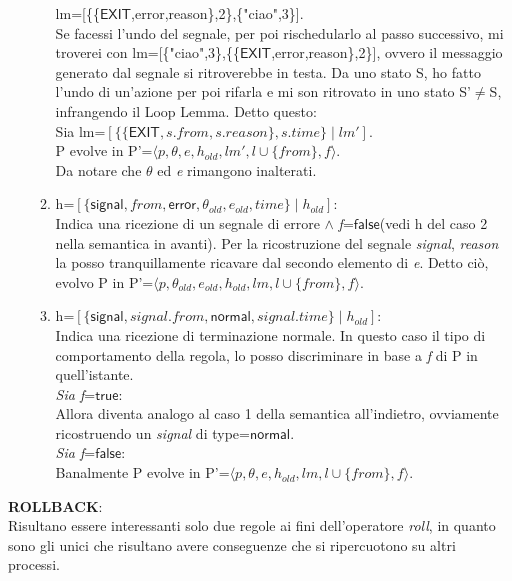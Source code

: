 \documentclass[Contributo.tex]{subfiles}
\begin{document}
\begin{itemize}
\begin{enumerate}
			  lm=[\{\{$\mathsf{EXIT}$,error,reason\},2\},\{"ciao",3\}].\\
			  Se facessi l'undo del segnale, per poi rischedularlo al passo successivo, mi troverei con lm=[\{"ciao",3\},\{\{$\mathsf{EXIT}$,error,reason\},2\}], ovvero il messaggio generato dal segnale si ritroverebbe in testa.
			  Da uno stato S, ho fatto l'undo di un'azione per poi rifarla e mi son ritrovato in uno stato S'$\neq$S, infrangendo il Loop Lemma.
			  Detto questo:\\
			  Sia lm=$\displaystyle [\{\{\mathsf{EXIT},s.from,s.reason\},s.time\} \mid lm']$.\\
			  P evolve in P'=$\displaystyle \langle p,\theta,e,h_{old},lm',l \cup \{from\},f \rangle$.\\
			  Da notare che $\theta$ ed \textit{e} rimangono inalterati.
		\item h=$\displaystyle [\{\mathsf{signal},from,\mathsf{error},\theta_{old},e_{old},time\} \mid h_{old}]$:\\
			  Indica una ricezione di un segnale di errore $\wedge$ \textit{f}=$\mathsf{false}$(vedi h del caso 2 nella semantica in avanti).
			  Per la ricostruzione del segnale \textit{signal}, \textit{reason} la posso tranquillamente ricavare dal secondo elemento di \textit{e}.
			  Detto ciò, evolvo P in P'=$\displaystyle \langle p,\theta_{old},e_{old},h_{old},lm,l \cup \{from\},f \rangle$.
		\item h=$\displaystyle [\{\mathsf{signal},signal.from,\mathsf{normal},signal.time\} \mid h_{old}]$:\\
			  Indica una ricezione di terminazione normale.
			  In questo caso il tipo di comportamento della regola, lo posso discriminare in base a \textit{f} di P in quell'istante.\\
			  \textit{Sia f}=$\mathsf{true}$:\\
			  Allora diventa analogo al caso 1 della semantica all'indietro, ovviamente ricostruendo un \textit{signal} di type=$\mathsf{normal}$.\\
			  \textit{Sia f}=$\mathsf{false}$:\\
			  Banalmente P evolve in P'=$\displaystyle \langle p,\theta,e,h_{old},lm,l \cup \{from\},f \rangle$.
	\end{enumerate}
	\end{itemize}
\textbf{ROLLBACK}:\\
	Risultano essere interessanti solo due regole ai fini dell'operatore \textit{roll}, in quanto sono gli unici che risultano avere conseguenze che si ripercuotono su altri processi.
\end{document}
